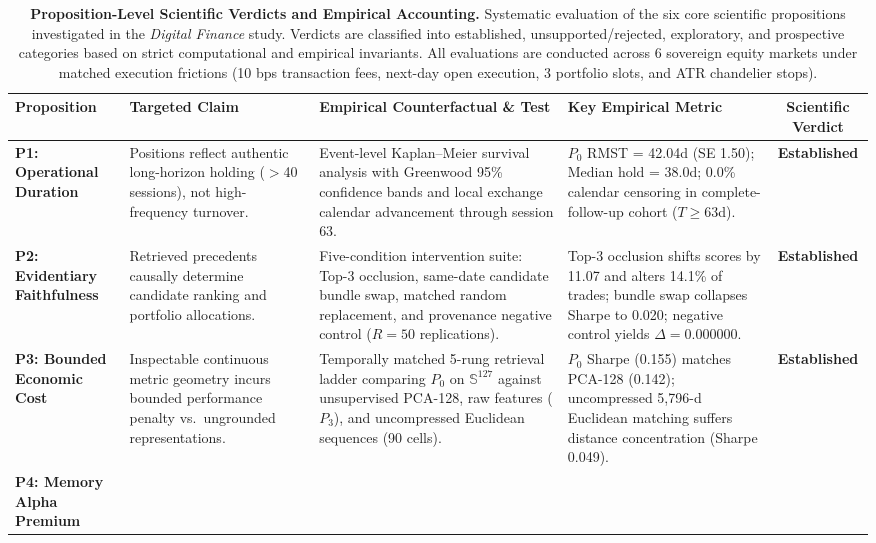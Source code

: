 \begin{table}[t]
\centering
\small
\caption{\textbf{Proposition-Level Scientific Verdicts and Empirical Accounting.} Systematic evaluation of the six core scientific propositions investigated in the \emph{Digital Finance} study. Verdicts are classified into established, unsupported/rejected, exploratory, and prospective categories based on strict computational and empirical invariants. All evaluations are conducted across 6 sovereign equity markets under matched execution frictions (10 bps transaction fees, next-day open execution, 3 portfolio slots, and ATR chandelier stops).}
\label{tab:proposition_verdicts}
\vspace{0.2cm}
\begin{tabularx}{\textwidth}{p{3.2cm} p{2.8cm} X p{2.2cm} c}
\toprule
\textbf{Proposition} & \textbf{Targeted Claim} & \textbf{Empirical Counterfactual \& Test} & \textbf{Key Empirical Metric} & \textbf{Scientific Verdict} \\
\midrule
\textbf{P1: Operational Duration} & 
Positions reflect authentic long-horizon holding ($>$40 sessions), not high-frequency turnover. & 
Event-level Kaplan--Meier survival analysis with Greenwood 95\% confidence bands and local exchange calendar advancement through session 63. & 
$P_0$ RMST = 42.04d (SE 1.50); Median hold = 38.0d; 0.0\% calendar censoring in complete-follow-up cohort ($T \ge 63$d). & 
\textbf{Established} \\
\addlinespace
\textbf{P2: Evidentiary Faithfulness} & 
Retrieved precedents causally determine candidate ranking and portfolio allocations. & 
Five-condition intervention suite: Top-3 occlusion, same-date candidate bundle swap, matched random replacement, and provenance negative control ($R=50$ replications). & 
Top-3 occlusion shifts scores by 11.07 and alters 14.1\% of trades; bundle swap collapses Sharpe to 0.020; negative control yields $\Delta = 0.000000$. & 
\textbf{Established} \\
\addlinespace
\textbf{P3: Bounded Economic Cost} & 
Inspectable continuous metric geometry incurs bounded performance penalty vs.\ ungrounded representations. & 
Temporally matched 5-rung retrieval ladder comparing $P_0$ on $\mathbb{S}^{127}$ against unsupervised PCA-128, raw features ($P_3$), and uncompressed Euclidean sequences (90 cells). & 
$P_0$ Sharpe (0.155) matches PCA-128 (0.142); uncompressed 5,796-d Euclidean matching suffers distance concentration (Sharpe 0.049). & 
\textbf{Established} \\
\addlinespace
\textbf{P4: Memory Alpha Premium} & 

\end{tabularx}
\end{table}
